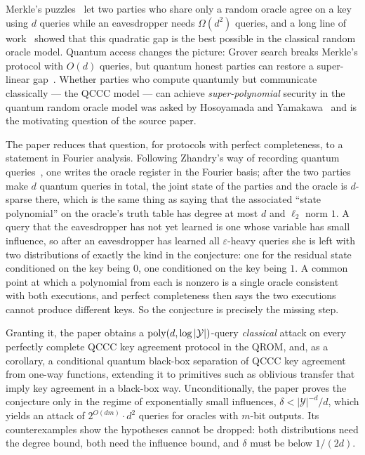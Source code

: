 \documentclass{aicr-conjecture}
\newcommand{\Yc}{\mathcal{Y}}
\begin{document}
Merkle's puzzles~\cite{Mer74} let two parties who share only a random
oracle agree on a key using $d$ queries while an eavesdropper needs
$\Omega(d^2)$ queries, and a long line of work~\cite{IR89,BMG09,BM17}
showed that this quadratic gap is the best possible in the classical
random oracle model. Quantum access changes the picture: Grover search
breaks Merkle's protocol with $O(d)$ queries, but quantum honest parties
can restore a super-linear gap~\cite{BS08}. Whether parties who compute
quantumly but communicate classically --- the QCCC model --- can achieve
\emph{super-polynomial} security in the quantum random oracle model was
asked by Hosoyamada and Yamakawa~\cite{HY20} and is the motivating
question of the source paper.

The paper reduces that question, for protocols with perfect
completeness, to a statement in Fourier analysis. Following Zhandry's
way of recording quantum queries~\cite{Zha19}, one writes the oracle
register in the Fourier basis; after the two parties make $d$ quantum
queries in total, the joint state of the parties and the oracle is
$d$-sparse there, which is the same thing as saying that the associated
``state polynomial'' on the oracle's truth table has degree at most $d$
and $\ell_2$ norm $1$. A query that the eavesdropper has not yet learned
is one whose variable has small influence, so after an eavesdropper has
learned all $\varepsilon$-heavy queries she is left with two
distributions of exactly the kind in the conjecture: one for the
residual state conditioned on the key being $0$, one conditioned on the
key being $1$. A common point at which a polynomial from each is nonzero
is a single oracle consistent with both executions, and perfect
completeness then says the two executions cannot produce different keys.
So the conjecture is precisely the missing step.

Granting it, the paper obtains a $\poly(d, \log|\Yc|)$-query
\emph{classical} attack on every perfectly complete QCCC key agreement
protocol in the QROM, and, as a corollary, a conditional quantum
black-box separation of QCCC key agreement from one-way functions,
extending it to primitives such as oblivious transfer that imply key
agreement in a black-box way. Unconditionally, the paper proves the
conjecture only in the regime of exponentially small influences,
$\delta < |\Yc|^{-d}/d$, which yields an attack of $2^{O(dm)} \cdot d^2$
queries for oracles with $m$-bit outputs. Its counterexamples show the
hypotheses cannot be dropped: both distributions need the degree bound,
both need the influence bound, and $\delta$ must be below $1/(2d)$.
\end{document}
